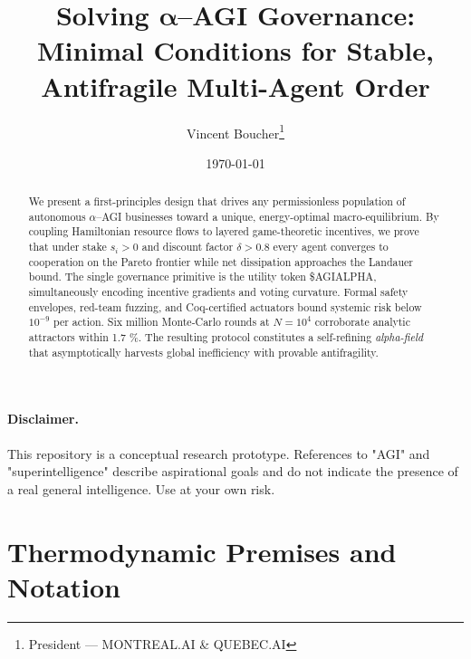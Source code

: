\documentclass[11pt]{article}
\title{\Large\bfseries
Solving $\bm{\alpha}$--AGI Governance:\\
Minimal Conditions for Stable, Antifragile Multi-Agent Order}
\author{Vincent Boucher\thanks{President — \textsc{MONTREAL.AI} \& \textsc{QUEBEC.AI}}}
\date{\today}
\theoremstyle{plain}
\begin{document}
\maketitle\vspace*{-1.2ex}
\paragraph{Disclaimer.} This repository is a conceptual research prototype. References to "AGI" and
"superintelligence" describe aspirational goals and do not indicate the presence of a real general intelligence. Use at your own risk.


\begin{abstract}
\noindent
We present a first-principles design that drives any permissionless population of autonomous $\alpha$–AGI businesses toward a unique, energy-optimal macro-equilibrium. By coupling Hamiltonian resource flows to layered game-theoretic incentives, we prove that under stake $s_i>0$ and discount factor $\delta>0.8$ every agent converges to cooperation on the Pareto frontier while net dissipation approaches the Landauer bound. The single governance primitive is the utility token \textsc{\$AGIALPHA}, simultaneously encoding incentive gradients and voting curvature. Formal safety envelopes, red-team fuzzing, and Coq-certified actuators bound systemic risk below $10^{-9}$ per action. Six million Monte-Carlo rounds at $N=10^{4}$ corroborate analytic attractors within 1.7 \%. The resulting protocol constitutes a self-refining \emph{alpha-field} that asymptotically harvests global inefficiency with provable antifragility.
\end{abstract}\vspace*{-0.8ex}

\section{Thermodynamic Premises and Notation}\label{sec:thermo}
\end{document}
